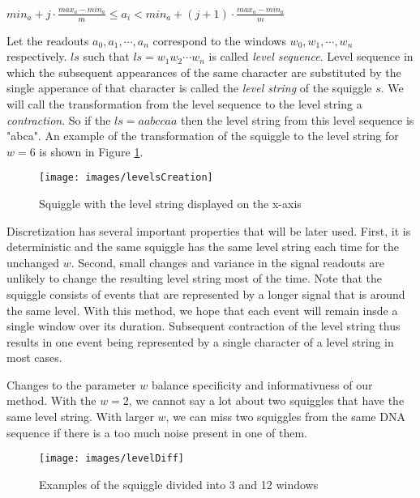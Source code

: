 \begin{center}
$min_a + j\cdot \frac{max_a-min_a}{m} \leq a_i < min_a + (j+1)\cdot \frac{max_a-min_a}{m}$
\end{center}

Let the readouts $a_0, a_1, \cdots, a_n$ correspond to the windows $w_0, w_1, \cdots ,w_n$
respectively. $ls$ such that $ls=w_1w_2\cdots w_n$ is called \textit{level sequence}.
Level sequence in which the subsequent appearances of the same character are substituted
by the single apperance of that character is called the \textit{level string} of the squiggle $s$.
We will call the transformation from the level sequence to the level string a \textit{contraction}.
So if the $ls=aabccaa$ then the level string from this level sequence is "abca". An example of the transformation
of the squiggle to the level string for $w=6$ is shown in Figure \ref{obr:levelsCreation}.

\begin{figure}
\centerline{\texttt{[image: images/levelsCreation]}}
\caption[TODO]{Squiggle with the level string displayed on the x-axis}
\label{obr:levelsCreation}
\end{figure}

Discretization has several important properties that will be later used.
First, it is deterministic and the same squiggle has the same level
string each time for the unchanged $w$. Second, small changes and variance in the signal readouts
are unlikely to change the resulting level string most of the time. Note that the squiggle
consists of events that are represented by a longer signal that is around the same level.
With this method, we hope that each event will remain insde a single window over its
duration. Subsequent contraction of the level string thus results in one event being represented by
a single character of a level string in most cases.

Changes to the parameter $w$ balance specificity and informativness of our method.
With the $w=2$, we cannot say a lot about two squiggles that have the same level string.
With larger $w$, we can miss two squiggles from the same DNA sequence if there is
a too much noise present in one of them.

\begin{figure}
\centerline{\texttt{[image: images/levelDiff]}}
\caption[TODO]{Examples of the squiggle divided into 3 and 12 windows}
\label{obr:levelDiff}
\end{figure}

